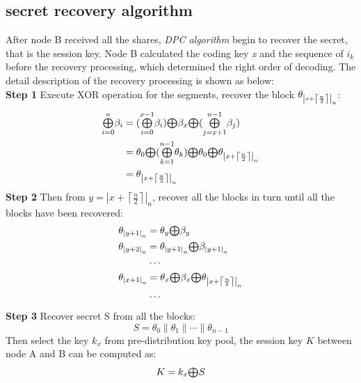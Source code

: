 \documentclass[nocopyrightspace,9pt]{sigplanconf}
\newcommand\lan[2]{{\left|{#1}\right|}_{#2}}
\newcommand\lanceil[2]{\left\lceil\frac{#1}{#2}\right\rceil}
\newcommand\bop[0]{\mathsmaller{\bigoplus}}
\begin{document}
\subsection{secret recovery algorithm}
After node B received all the shares, \textit{DPC algorithm} begin to recover the secret,
that is the session key. Node B calculated the coding key \textit{x} and the sequence of $i_k$
before the recovery processing, which determined the right order of decoding.
The detail description of the recovery processing is shown as below:\\

\noindent\textbf{Step 1} Execute XOR operation for the segments, recover the block $\theta_\mathsmaller{{\lan{x+\lanceil{n}{2}}{n}}}$:\\
\begin{equation}\label{rev_1}
\begin{split}
  \bop\limits_{i=0}^{n} \beta_i
  &=(\bop\limits_{i=0}^{x-1}\beta_i)\bop \beta_x
  \bop (\bop\limits_{j=x+1}^{n-1}\beta_j)\\
  &=\theta_0\bop(\bop\limits_{k=1}^{n-1}\theta_k)
  \bop\theta_0\bop\theta_{\lan{x+\lanceil{n}{2}}{n}}\\
  &=\theta_{\lan{x+\lanceil{n}{2}}{n}}
\end{split}
\end{equation}
\textbf{Step 2} Then from $y=\lan{x+\lanceil{n}{2}}{n}$, recover all the blocks in turn
until all the blocks have been recovered:\\
\begin{equation}\label{rev_2}
  \begin{split}
    &\theta_{\lan{y+1}{n}}=\theta_y\bop \beta_y\\
    &\theta_{\lan{y+2}{n}}=\theta_{\lan{y+1}{n}}\bop \beta_{\lan{y+1}{n}}\\
    &\qquad\quad\cdots\\
    &\theta_{\lan{x+1}{n}}=\theta_x\bop \beta_x \bop \theta_{\lan{x+\lanceil{n}{2}}{n}}\\
    &\qquad\quad\cdots\\
  \end{split}
\end{equation}
\textbf{Step 3} Recover secret S from all the blocks:\\
\begin{equation}\label{rev_3}
  S=\theta_0\parallel\theta_1\parallel\cdots\parallel\theta_{n-1}
\end{equation}
Then select the key $k_x$ from pre-distribution key pool, the session key $K$
between node A and B can be computed as:
\begin{equation}
  K=k_x\bop S
\end{equation}
\end{document}
